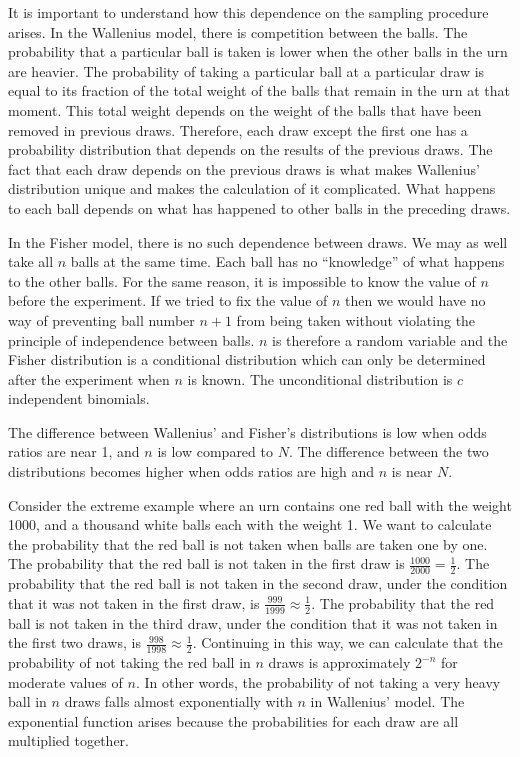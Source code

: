 \documentclass[a4paper]{article}
\begin{document}
It is important to understand how this dependence on the sampling procedure
arises. In the Wallenius model, there is competition between the balls.
The probability that a particular ball is taken is lower when the other 
balls in the urn are heavier. The probability of taking a particular ball
at a particular draw is equal to its fraction of the total weight of the
balls that remain in the urn at that moment. This total weight 
depends on the weight of
the balls that have been removed in previous draws. Therefore, each draw
except the first one has a probability distribution that depends on the
results of the previous draws. The fact that each draw depends on the 
previous draws is what makes Wallenius' distribution unique and makes the
calculation of it complicated. What happens to each ball depends on what
has happened to other balls in the preceding draws.

In the Fisher model, there is no such dependence between draws. We may 
as well take all $n$ balls at the same time. Each ball
has no ``knowledge'' of what happens to the other balls. For the same 
reason, it is impossible to know the value of $n$ before the experiment.
If we tried to fix the value of $n$ then we would have no way of 
preventing ball number $n+1$ from being taken without violating the principle
of independence between balls. $n$ is therefore a random variable and
the Fisher distribution is a conditional distribution which can only
be determined after the experiment when $n$ is known. The unconditional
distribution is $c$ independent binomials.

The difference between Wallenius' and Fisher's distributions is low 
when odds ratios are
near 1, and $n$ is low compared to $N$. The difference between the two 
distributions becomes higher when odds ratios are high and $n$ is near $N$.

Consider the extreme example where an urn contains one red ball with the
weight 1000, and a thousand white balls each with the weight 1. 
We want to calculate the probability that the red ball is not taken 
when balls are taken one by one.
The probability that the red ball is not taken in the first draw is 
$\frac{1000}{2000} = \frac 12$. The probability that the red ball is
not taken in the second draw, under the condition that it was not taken
in the first draw, is $\frac{999}{1999} \approx \frac 12$.  
The probability that the red ball is
not taken in the third draw, under the condition that it was not taken
in the first two draws, is $\frac{998}{1998} \approx \frac 12$.  
Continuing in this way, we can calculate that the probability of not
taking the red ball in $n$ draws is approximately $2^{-n}$ for moderate
values of $n$.  
In other words, the probability of not taking a very heavy ball in $n$ 
draws falls almost exponentially with $n$ in Wallenius' model.
The exponential function arises because the probabilities for each draw
are all multiplied together.
\end{document}
